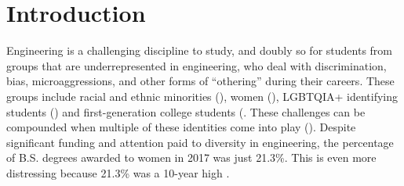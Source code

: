 \section{Introduction}
\label{sec:intro}

 
Engineering is a challenging discipline to study, and doubly so for students from groups that are underrepresented in engineering, who deal with discrimination, bias, microaggressions, and other forms of “othering” during their careers. These groups include racial and ethnic minorities (\eg \cite{Mcgee:2011}), women (\eg \cite{Moss-Racusin:2012}), LGBTQIA+ identifying students (\eg \cite{Cech:2011}) and first-generation college students (\eg \cite{Pascarella:2004,Carrigan, et al., 2019}. These challenges can be compounded when multiple of these identities come into play (\eg \citep{Williams:2014}). Despite significant funding and attention paid to diversity in engineering, the percentage of B.S. degrees awarded to women in 2017 was just 21.3\%.  This is even more distressing because 21.3\% was a 10-year high \citep{Asee 2017}. 

